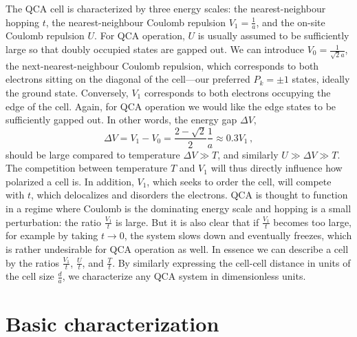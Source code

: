 The QCA cell is characterized by three energy scales: the nearest-neighbour
hopping $t$, the nearest-neighbour Coulomb repulsion $V_1 = \frac{1}{a}$, and
the on-site Coulomb repulsion $U$. For QCA operation, $U$ is usually assumed to
be sufficiently large so that doubly occupied states are gapped out. We can
introduce $V_0 = \frac{1}{\sqrt{2} a}$, the next-nearest-neighbour Coulomb
repulsion, which corresponds to both electrons sitting on the diagonal of the
cell---our preferred $P_k=\pm1$ states, ideally the ground state. Conversely,
$V_1$ corresponds to both electrons occupying the edge of the cell. Again, for
QCA operation we would like the edge states to be sufficiently gapped out. In
other words, the energy gap $\Delta V$, 
\begin{equation}
  \label{eq:deltaV}
  \Delta V = V_1 - V_0 = \frac{2 - \sqrt{2}}{2} \frac{1}{a} \approx 0.3 V_1 \, ,
\end{equation}
should be large compared to temperature $\Delta V \gg T$, and similarly $U \gg
\Delta V \gg T$. The competition between temperature $T$ and $V_1$ will thus
directly influence how polarized a cell is. In addition, $V_1$, which seeks to
order the cell, will compete with $t$, which delocalizes and disorders the
electrons. QCA is thought to function in a regime where Coulomb is the
dominating energy scale and hopping is a small perturbation: the ratio
$\frac{V_1}{t}$ is large. But it is also clear that if $\frac{V_1}{t}$ becomes
too large, for example by taking $t \rightarrow 0$, the system slows down and
eventually freezes, which is rather undesirable for QCA operation as well. In
essence we can describe a cell by the ratios $\frac{V_1}{t}$, $\frac{U}{t}$, and
$\frac{T}{t}$. By similarly expressing the cell-cell distance in units of the
cell size $\frac{d}{a}$, we characterize any QCA system in dimensionless units.


\section{Basic characterization}
\label{sec:basic_characterization}

